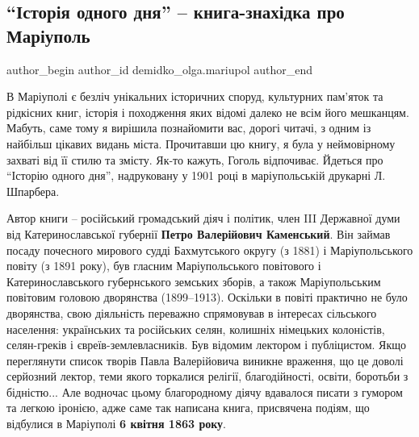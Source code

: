  
 
 
 
 
 
\subsection{\enquote{Історія одного дня} – книга-знахідка про Маріуполь}
\label{sec:04_03_2020.stz.news.ua.mrpl_city.1.knyga_istoria_odnogo_dnja}
 
\ifcmt
 author_begin
   author_id demidko_olga.mariupol
 author_end
\fi


В Маріуполі є безліч унікальних історичних споруд, культурних пам'яток та
рідкісних книг, історія і походження яких відомі далеко не всім його мешканцям.
Мабуть, саме тому я вирішила познайомити вас, дорогі читачі, з одним із
найбільш цікавих видань міста. Прочитавши цю книгу, я була у неймовірному
захваті від її стилю та змісту. Як-то кажуть, Гоголь відпочиває. Йдеться про
\enquote{Історію одного дня}, надруковану у 1901 році в маріупольській друкарні Л.
Шпарбера.


Автор книги – російський громадський діяч і політик, член III Державної думи
від Катеринославської губернії \textbf{Петро Валерійович Каменський}. Він займав посаду
почесного мирового судді Бахмутського округу (з 1881) і Маріупольського повіту
(з 1891 року), був гласним Маріупольського повітового і Катеринославського
губернського земських зборів, а також Маріупольським повітовим головою
дворянства (1899–1913). Оскільки в повіті практично не було дворянства, свою
діяльність переважно спрямовував в інтересах сільського населення: українських
та російських селян, колишніх німецьких колоністів, селян-греків і
євреїв-землевласників. Був відомим лектором і публіцистом. Якщо переглянути
список творів Павла Валерійовича виникне враження, що це доволі серйозний
лектор, теми якого торкалися релігії, благодійності, освіти, боротьби з
бідністю... Але водночас цьому благородному діячу вдавалося писати з гумором та
легкою іронією, адже саме так написана книга, присвячена подіям, що відбулися в
Маріуполі \textbf{6 квітня 1863 року}.

